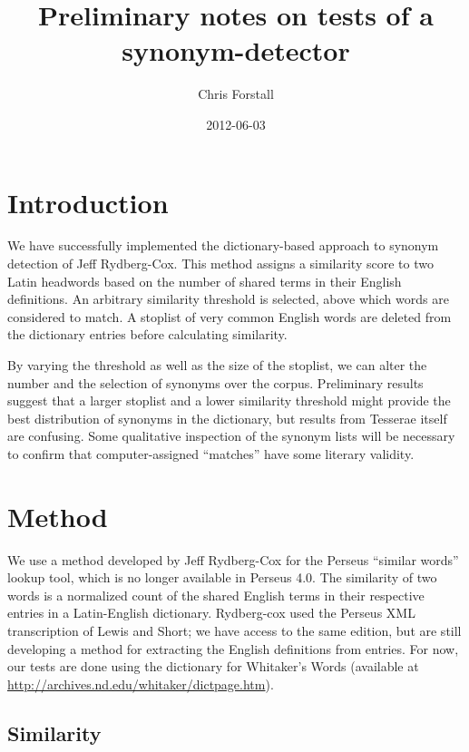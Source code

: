 \documentclass[]{article}
\title{Preliminary notes on tests of a synonym-detector}
\author{Chris Forstall}
\date{2012-06-03}
\begin{document}
	
	\setmainfont{Arial}
	
	\maketitle


	\section{Introduction}
		
		We have successfully implemented the dictionary-based approach to synonym detection of Jeff Rydberg-Cox.  This method assigns a similarity score to two Latin headwords based on the number of shared terms in their English definitions.  An arbitrary similarity threshold is selected, above which words are considered to match.  A stoplist of very common English words are deleted from the dictionary entries before calculating similarity.
		
		By varying the threshold as well as the size of the stoplist, we can alter the number and the selection of synonyms over the corpus.  Preliminary results suggest that a larger stoplist and a lower similarity threshold might provide the best distribution of synonyms in the dictionary, but results from Tesserae itself are confusing.  Some qualitative inspection of the synonym lists will be necessary to confirm that computer-assigned “matches” have some literary validity.

	\section{Method}
	
		
		We use a method developed by Jeff Rydberg-Cox for the Perseus “similar words” lookup tool, which is no longer available in Perseus 4.0.  The similarity of two words is a normalized count of the shared English terms in their respective entries in a Latin-English dictionary.  Rydberg-cox used the Perseus XML transcription of Lewis and Short; we have access to the same edition, but are still developing a method for extracting the English definitions from entries.  For now, our tests are done using the dictionary for Whitaker's Words (available at \url{http://archives.nd.edu/whitaker/dictpage.htm}).
		
	\subsection{Similarity}
		
\end{document}
